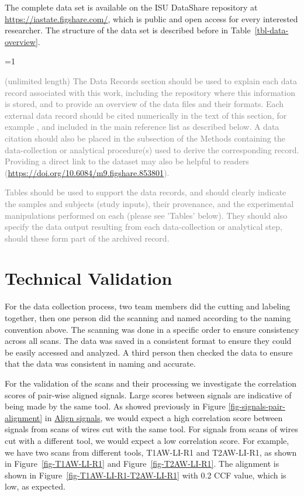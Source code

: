 \documentclass[fleqn,10pt]{wlscirep}
\newcommand{\ifinstruction}{0} %
\begin{document}
The complete data set is available on the ISU DataShare repository at
\href{https://iastate.figshare.com/}{https://iastate.figshare.com/},
which is public and open access for every interested researcher. The
structure of the data set is described before in
Table~\ref{tbl-data-overview}.

\ifnum \ifinstruction=1

\textcolor{gray}{(unlimited length) The Data Records section should be used to explain each data record associated with this work, including the repository where this information is stored, and to provide an overview of the data files and their formats. Each external data record should be cited numerically in the text of this section, for example \cite{Hao:gidmaps:2014}, and included in the main reference list as described below. A data citation should also be placed in the subsection of the Methods containing the data-collection or analytical procedure(s) used to derive the corresponding record. Providing a direct link to the dataset may also be helpful to readers (\hyperlink{https://doi.org/10.6084/m9.figshare.853801}{https://doi.org/10.6084/m9.figshare.853801}).}

\textcolor{gray}{Tables should be used to support the data records, and should clearly indicate the samples and subjects (study inputs), their provenance, and the experimental manipulations performed on each (please see 'Tables' below). They should also specify the data output resulting from each data-collection or analytical step, should these form part of the archived record.}
\fi

\section*{Technical Validation}\label{sec-technical-validation}

For the data collection process, two team members did the cutting and
labeling together, then one person did the scanning and named according
to the naming convention above. The scanning was done in a specific
order to ensure consistency across all scans. The data was saved in a
consistent format to ensure they could be easily accessed and analyzed.
A third person then checked the data to ensure that the data was
consistent in naming and accurate.

For the validation of the scans and their processing we investigate the
correlation scores of pair-wise aligned signals. Large scores between
signals are indicative of being made by the same tool. As showed
previously in Figure \ref{fig-signals-pair-alignment} in
\hyperref[sec-align-signals]{Align signals}, we would expect a high
correlation score between signals from scans of wires cut with the same
tool. For signals from scans of wires cut with a different tool, we
would expect a low correlation score. For example, we have two scans
from different tools, T1AW-LI-R1 and T2AW-LI-R1, as shown in
Figure~\ref{fig-T1AW-LI-R1} and Figure~\ref{fig-T2AW-LI-R1}. The
alignment is shown in Figure~\ref{fig-T1AW-LI-R1-T2AW-LI-R1} with 0.2
CCF value, which is low, as expected.
\end{document}
